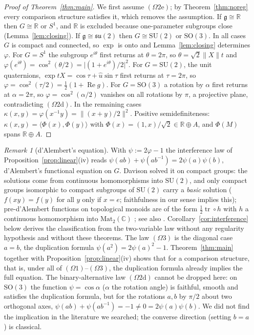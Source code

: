 \documentclass[11pt,reqno]{amsart}
\theoremstyle{definition}
\theoremstyle{remark}
\newtheorem{remark}[theorem]{Remark}
\numberwithin{equation}{section}
\newcommand{\R}{\mathbb{R}}
\newcommand{\C}{\mathbb{C}}
\newcommand{\g}{\mathfrak{g}}
\newcommand{\su}{\mathfrak{su}}
\newcommand{\re}{\operatorname{Re}}
\newcommand{\ip}[2]{\langle #1,#2\rangle}
\newcommand{\SU}{\mathrm{SU}}
\newcommand{\SO}{\mathrm{SO}}
\begin{document}
\begin{proof}[Proof of Theorem~\ref{thm:main}]
We first assume $(\Omega2\mathrm e)$; by Theorem~\ref{thm:noreg} every comparison structure satisfies it, which removes the
assumption.  If $\g\cong\R$ then $G\cong\R$ or $S^1$, and $\R$ is excluded because one-parameter subgroups close
(Lemma~\ref{lem:closing}).  If $\g\cong\su(2)$ then $G\cong\SU(2)$ or $\SO(3)$.  In all cases $G$ is compact
and connected, so $\exp$ is onto and Lemma~\ref{lem:closing} determines $\varphi$.  For $G=S^1$ the
subgroup $e^{i\theta}$ first returns at $\theta=2\pi$, so $\theta=\sqrt2\lVert X\rVert t$ and
$\varphi(e^{i\theta})=\cos^2(\theta/2)=\lvert(1+e^{i\theta})/2\rvert^2$.  For $G=\SU(2)$, the unit
quaternions, $\exp tX=\cos\tau+\hat u\sin\tau$ first returns at $\tau=2\pi$, so
$\varphi=\cos^2(\tau/2)=\tfrac12(1+\re g)$.  For $G=\SO(3)$ a rotation by $\alpha$ first returns at
$\alpha=2\pi$, so $\varphi=\cos^2(\alpha/2)$ vanishes on all rotations by $\pi$, a projective plane,
contradicting $(\Omega2\mathrm d)$.  In the remaining cases $\kappa(x,y)=\varphi(x^{-1}y)=\lVert(x+y)/2\rVert^2$.
Positive semidefiniteness: $\kappa(x,y)=\ip{\Phi(x)}{\Phi(y)}$ with $\Phi(x)=(1,x)/\sqrt2\in\R\oplus A$,
and $\Phi(M)$ spans $\R\oplus A$.
\end{proof}

\begin{remark}[d'Alembert's equation]\label{rem:dalembert}
With $\psi:=2\varphi-1$ the interference law of Proposition~\ref{prop:linear}(iv) reads
$\psi(ab)+\psi(ab^{-1})=2\psi(a)\psi(b)$, d'Alembert's functional equation on $G$.  Davison
\cite{Davison08} solved it on compact groups: the solutions come from continuous homomorphisms into $\SU(2)$, and
only compact groups isomorphic to compact subgroups of $\SU(2)$ carry a \emph{basic} solution ($f(xy)=f(y)$ for all $y$
only if $x=e$; faithfulness in our sense implies this); pre-d'Alembert functions on topological monoids are of the form
$\tfrac12\operatorname{tr}\circ h$ with $h$ a continuous homomorphism into $\mathrm{Mat}_2(\C)$ \cite[Thm.~4.12]{Davison09};
see also \cite{Stetkaer}.  Corollary~\ref{cor:interference} below derives the
classification from the two-variable law without any regularity hypothesis and without these theorems.  The law $(\Omega3)$ is the diagonal case $a=b$, the duplication formula
$\psi(a^2)=2\psi(a)^2-1$.  Theorem~\ref{thm:main} together with Proposition~\ref{prop:linear}(iv) shows
that for a comparison structure, that is, under all of $(\Omega1)$--$(\Omega3)$, the duplication formula
already implies the full equation.  The binary-alternative law $(\Omega2\mathrm d)$ cannot be dropped here:
on $\SO(3)$ the function $\psi=\cos\alpha$ ($\alpha$ the rotation angle) is faithful, smooth and satisfies the
duplication formula, but for the rotations $a,b$ by $\pi/2$ about two orthogonal axes,
$\psi(ab)+\psi(ab^{-1})=-1\ne0=2\psi(a)\psi(b)$.  We did not find the implication in the literature we
searched; the converse direction (setting $b=a$) is classical.
\end{remark}
\end{document}
